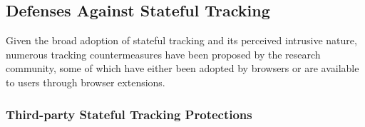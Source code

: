 \subsection{Defenses Against Stateful Tracking}
\label{sec:stateful-defenses}

Given the broad adoption of stateful tracking and its perceived intrusive nature, numerous tracking countermeasures have been proposed by the research community, some of which have either been adopted by browsers or are available to users through browser extensions.

\vspace{-4mm}
\subsubsection{Third-party Stateful Tracking Protections}


